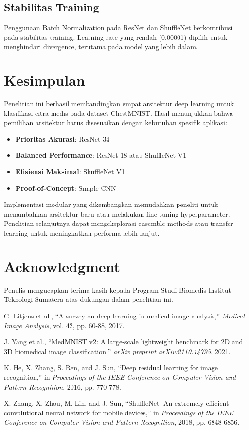 \documentclass[conference]{IEEEtran}
\begin{document}
\subsection{Stabilitas Training}
Penggunaan Batch Normalization pada ResNet dan ShuffleNet berkontribusi pada stabilitas training. Learning rate yang rendah (0.00001) dipilih untuk menghindari divergence, terutama pada model yang lebih dalam.

\section{Kesimpulan}
Penelitian ini berhasil membandingkan empat arsitektur deep learning untuk klasifikasi citra medis pada dataset ChestMNIST. Hasil menunjukkan bahwa pemilihan arsitektur harus disesuaikan dengan kebutuhan spesifik aplikasi:

\begin{itemize}
    \item \textbf{Prioritas Akurasi}: ResNet-34
    \item \textbf{Balanced Performance}: ResNet-18 atau ShuffleNet V1
    \item \textbf{Efisiensi Maksimal}: ShuffleNet V1
    \item \textbf{Proof-of-Concept}: Simple CNN
\end{itemize}

Implementasi modular yang dikembangkan memudahkan peneliti untuk menambahkan arsitektur baru atau melakukan fine-tuning hyperparameter. Penelitian selanjutnya dapat mengeksplorasi ensemble methods atau transfer learning untuk meningkatkan performa lebih lanjut.

\section*{Acknowledgment}
Penulis mengucapkan terima kasih kepada Program Studi Biomedis Institut Teknologi Sumatera atas dukungan dalam penelitian ini.

\begin{thebibliography}{00}
 G. Litjens et al., ``A survey on deep learning in medical image analysis,'' \textit{Medical Image Analysis}, vol. 42, pp. 60-88, 2017.

 J. Yang et al., ``MedMNIST v2: A large-scale lightweight benchmark for 2D and 3D biomedical image classification,'' \textit{arXiv preprint arXiv:2110.14795}, 2021.

 K. He, X. Zhang, S. Ren, and J. Sun, ``Deep residual learning for image recognition,'' in \textit{Proceedings of the IEEE Conference on Computer Vision and Pattern Recognition}, 2016, pp. 770-778.

 X. Zhang, X. Zhou, M. Lin, and J. Sun, ``ShuffleNet: An extremely efficient convolutional neural network for mobile devices,'' in \textit{Proceedings of the IEEE Conference on Computer Vision and Pattern Recognition}, 2018, pp. 6848-6856.
\end{thebibliography}
\end{document}
